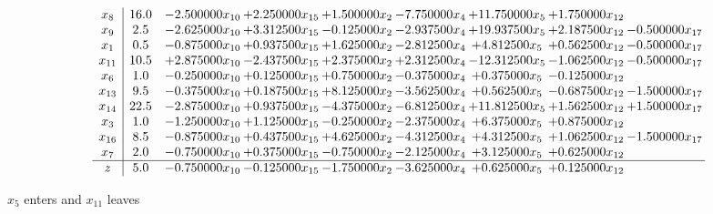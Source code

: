 \documentclass[10pt]{article}
\begin{document}
 \[\begin{array}{c| c c@{\hskip 2pt} c@{\hskip 2pt} c@{\hskip 2pt} c@{\hskip 2pt} c@{\hskip 2pt} c@{\hskip 2pt} c@{\hskip 2pt} }
 x_{8}   &  16.0 & -2.500000 x_{10} & + 2.250000 x_{15} & + 1.500000 x_{2} & -7.750000 x_{4} & + 11.750000 x_{5} & + 1.750000 x_{12} &   \\
 x_{9}   &  2.5 & -2.625000 x_{10} & + 3.312500 x_{15} & -0.125000 x_{2} & -2.937500 x_{4} & + 19.937500 x_{5} & + 2.187500 x_{12} & -0.500000 x_{17}\\
 x_{1}   &  0.5 & -0.875000 x_{10} & + 0.937500 x_{15} & + 1.625000 x_{2} & -2.812500 x_{4} & + 4.812500 x_{5} & + 0.562500 x_{12} & -0.500000 x_{17}\\
 x_{11}   &  10.5 & + 2.875000 x_{10} & -2.437500 x_{15} & + 2.375000 x_{2} & + 2.312500 x_{4} & -12.312500 x_{5} & -1.062500 x_{12} & -0.500000 x_{17}\\
 x_{6}   &  1.0 & -0.250000 x_{10} & + 0.125000 x_{15} & + 0.750000 x_{2} & -0.375000 x_{4} & + 0.375000 x_{5} & -0.125000 x_{12} &   \\
 x_{13}   &  9.5 & -0.375000 x_{10} & + 0.187500 x_{15} & + 8.125000 x_{2} & -3.562500 x_{4} & + 0.562500 x_{5} & -0.687500 x_{12} & -1.500000 x_{17}\\
 x_{14}   &  22.5 & -2.875000 x_{10} & + 0.937500 x_{15} & -4.375000 x_{2} & -6.812500 x_{4} & + 11.812500 x_{5} & + 1.562500 x_{12} & + 1.500000 x_{17}\\
 x_{3}   &  1.0 & -1.250000 x_{10} & + 1.125000 x_{15} & -0.250000 x_{2} & -2.375000 x_{4} & + 6.375000 x_{5} & + 0.875000 x_{12} &   \\
 x_{16}   &  8.5 & -0.875000 x_{10} & + 0.437500 x_{15} & + 4.625000 x_{2} & -4.312500 x_{4} & + 4.312500 x_{5} & + 1.062500 x_{12} & -1.500000 x_{17}\\
 x_{7}   &  2.0 & -0.750000 x_{10} & + 0.375000 x_{15} & -0.750000 x_{2} & -2.125000 x_{4} & + 3.125000 x_{5} & + 0.625000 x_{12} &   \\
\hline
z    &  5.0 & -0.750000 x_{10} & -0.125000 x_{15} & -1.750000 x_{2} & -3.625000 x_{4} & + 0.625000 x_{5} & + 0.125000 x_{12} &   \\
\end{array}\]


 $ x_{5} $ enters and $ x_{11} $ leaves 
\end{document}
